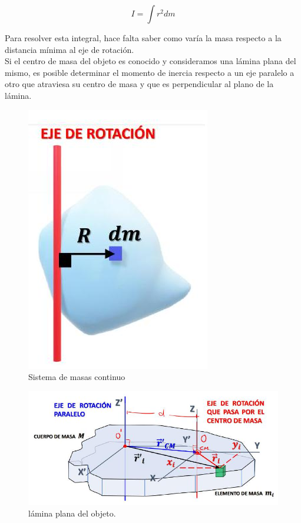 \documentclass[10pt]{article}
\begin{document}
\begin{equation*}
I=\int r^{2} d m \tag{5}
\end{equation*}


Para resolver esta integral, hace falta saber como varía la masa respecto a la distancia mínima al eje de rotación.\\

Si el centro de masa del objeto es conocido y consideramos una lámina plana del mismo, es posible determinar el momento de inercia respecto a un eje paralelo a otro que atraviesa su centro de masa y que es perpendicular al plano de la lámina.
\begin{figure}[H]
    \centering
\includegraphics[scale = 0.30, center]{2025_04_01_ea720b93e8ebb5d0c6aeg-05}
\caption{Sistema de masas continuo}
\end{figure}


\begin{figure}[H]
    \centering
\includegraphics[scale = 0.30, center]{2025_04_01_ea720b93e8ebb5d0c6aeg-05(1)}
\caption{lámina plana del objeto. }
\end{figure}
\end{document}
